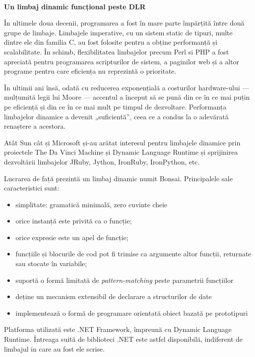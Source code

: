 \documentclass[12pt,a4paper]{memoir}
\begin{document}
\thispagestyle{empty}
\begin{centering}
\textbf{\\\Large{Un limbaj dinamic funcțional peste DLR}}
\\[1.5cm]
\end{centering}
În ultimele doua decenii, programarea a fost în mare parte împărțită între două grupe de limbaje. Limbajele imperative, cu un sistem static de tipuri, multe dintre ele din familia C, au fost folosite pentru a obține performanță și scalabilitate. În schimb, flexibilitatea limbajelor precum Perl si PHP a fost apreciată pentru programarea scripturilor de sistem, a paginilor web și a altor programe pentru care eficiența nu reprezintă o prioritate.

În ultimii ani însă, odată cu reducerea exponențială a costurilor hardware-ului — mulțumită legii lui Moore — accentul a început să se pună din ce în ce mai puțin pe eficiență și din ce în ce mai mult pe timpul de dezvoltare. Performanța limbajelor dinamice a devenit „suficientă”, ceea ce a condus la o adevărată renaștere a acestora.

Atât Sun cât și Microsoft și-au arătat interesul pentru limbajele dinamice prin proiectele The Da Vinci Machine și Dynamic Language Runtime și sprijinirea dezvoltării limbajelor JRuby, Jython, IronRuby, IronPython, etc.

Lucrarea de față prezintă un limbaj dinamic numit Bonsai. Principalele sale caracteristici sunt:
\begin{itemize}
\item simplitate: gramatică minimală, zero cuvinte cheie
\item orice instanță este privită ca o funcție;
\item orice expresie este un apel de funcție;
\item funcțiile și blocurile de cod pot fi trimise ca argumente altor funcții, returnate sau stocate în variabile;
\item suportă o formă limitată de \emph{pattern-matching} peste parametrii funcțiilor
\item deține un mecanism extensibil de declarare a structurilor de date 
\item implementează o formă de programare orientată obiect bazată pe prototipuri
\end{itemize}

Platforma utilizată este .NET Framework, împreună cu Dynamic Language Runtime. Întreaga suită de biblioteci .NET este astfel disponibilă, indiferent de limbajul in care au fost ele scrise. 
\end{document}
